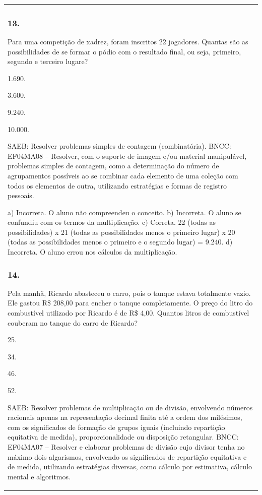\begin{mdframed}[linewidth=2pt,linecolor=salmao,roundcorner=2pt]
\begin{escolha}
{{{\begin{longtable}[]{@{}l@{}}
\begin{itemize}
{\subsubsection{13.}

Para uma competição de xadrez, foram inscritos 22 jogadores. Quantas são
as possibilidades de se formar o pódio com o resultado final, ou seja,
primeiro, segundo e terceiro lugare?

\begin{escolha}
\item
  1.690.
\item
  3.600.
\item
  9.240.
\item
  10.000.
\end{escolha}

SAEB: Resolver problemas simples de contagem (combinatória).
BNCC: EF04MA08 -- Resolver, com o suporte de imagem e/ou material manipulável, problemas simples
de contagem, como a determinação do número de agrupamentos possíveis ao se combinar cada
elemento de uma coleção com todos os elementos de outra, utilizando estratégias e formas de
registro pessoais.

a) Incorreta. O aluno não compreendeu o conceito.
b) Incorreta. O aluno se confundiu com os termos da multiplicação.
c) Correta. 22 (todas as possibilidades) x 21 (todas as possibilidades menos o primeiro lugar) x 20 (todas as possibilidades menos o primeiro e o segundo lugar) = 9.240.
d) Incorreta. O aluno errou nos cálculos da multiplicação.

\subsubsection{14.}

Pela manhã, Ricardo abasteceu o carro, pois o tanque estava totalmente
vazio. Ele gastou R\$ 208,00 para encher o tanque completamente.
O preço do litro do combustível utilizado por Ricardo
é de R\$ 4,00. Quantos litros de combustível couberam no tanque do carro de
Ricardo?

\begin{escolha}
\item
  25.
\item
  34.
\item
  46.
\item
  52.
\end{escolha}

SAEB: Resolver problemas de multiplicação ou de divisão,
envolvendo números racionais apenas na representação decimal finita até
a ordem dos milésimos, com os significados de formação de grupos iguais
(incluindo repartição equitativa de medida), proporcionalidade ou
disposição retangular.
BNCC: EF04MA07 -- Resolver e elaborar problemas de divisão cujo divisor tenha no máximo dois algarismos,
envolvendo os significados de repartição equitativa e de medida, utilizando estratégias diversas,
como cálculo por estimativa, cálculo mental e algoritmos.

}
\end{itemize}
\end{longtable}}}}
\end{escolha}
\end{mdframed}
